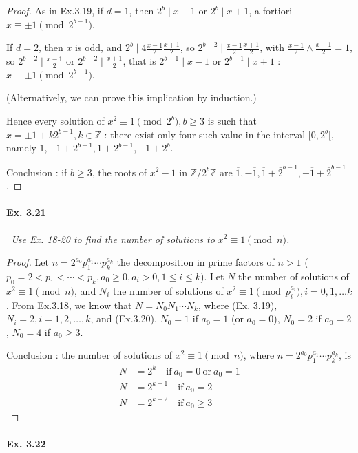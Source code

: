 \documentclass[11pt,a4paper]{article}
\newcommand{\Z}{\mathbb{Z}}
\begin{document}
{\begin{proof}
As in Ex.3.19, if $d=1$, then $2^b \mid x-1$ or $2^b \mid x+1$, a fortiori $x \equiv \pm 1 \pmod{2^{b-1}}$.

If $d=2$, then $x$ is odd, and $2^b \mid 4\frac{x-1}{2}\frac{x+1}{2}$,  so $2^{b-2} \mid \frac{x-1}{2}\frac{x+1}{2}$, with $\frac{x-1}{2} \wedge \frac{x+1}{2}=1$, so $2^{b-2} \mid \frac{x-1}{2}$ or $2^{b-2} \mid \frac{x+1}{2}$, that is $2^{b-1} \mid x-1$ or $2^{b-1} \mid x+1$ : $x \equiv \pm 1 \pmod{2^{b-1}}$.

(Alternatively, we can prove this implication by induction.)

Hence every solution of $x^2 \equiv 1\pmod{2^b}, b\geq 3$ is such that $x = \pm1+k2^{b-1}, k \in \Z$ : there exist only four such value in the interval $[0,2^b[$, namely $1,-1+2^{b-1},1+2^{b-1},-1+2^b$.

Conclusion : if $b\geq 3$, the roots of $x^2-1$ in $\Z/2^b\Z$ are $ \overline{1}, -\overline{1}, \overline{1} + \overline{2}^{b-1},-\overline{1} + \overline{2}^{b-1}$.
\end{proof}

\paragraph{Ex. 3.21}

{\it \
Use Ex. 18-20 to find the number of solutions to $x^2 \equiv 1 \pmod n$.
}

\begin{proof}
Let $n = 2^{a_0}p_1^{a_1}\cdots p_k^{a_k}$ the decomposition in prime factors of $n>1$ ($p_0=2<p_1<\cdots<p_k, a_0\geq 0, a_i>0, 1\leq i \leq k$). Let $N$ the number of solutions of $x^2 \equiv 1 \pmod n$, and $N_i$ the number of solutions of $x^2 \equiv 1 \pmod {p_i^{a_i}}, i = 0,1,\ldots k$. From Ex.3.18, we know that $N = N_0N_1\cdots N_k$, where (Ex. 3.19), $N_i = 2, i=1,2,\ldots,k$, and (Ex.3.20), $N_0=1$ if $a_0=1$ (or $a_0 = 0$), $N_0 = 2$ if $a_0 = 2$, $N_0=4$ if $a_0\geq 3$.

Conclusion : the number of solutions of $x^2 \equiv 1 \pmod n$,  where $n = 2^{a_0}p_1^{a_1}\cdots p_k^{a_k}$, is
\begin{align*}
N &= 2^k\quad \mathrm{if}\ a_0=0\ \mathrm{or}\ a_0 = 1\\
N &= 2^{k+1} \quad \mathrm{if}\ a_0=2\\
N &= 2^{k+2} \quad \mathrm{if}\ a_0\geq 3
\end{align*}
\end{proof}

\paragraph{Ex. 3.22}

}
\end{document}
